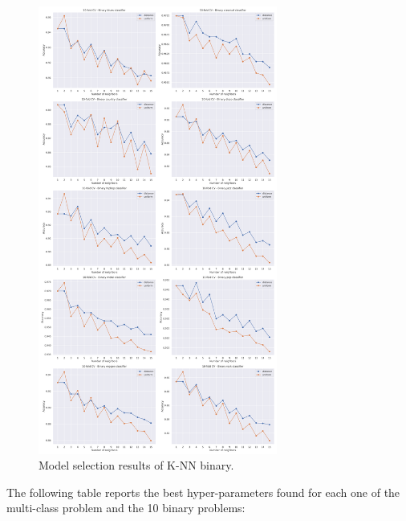 \documentclass{Configuration_Files/PoliMi3i_thesis}
\begin{document}
\begin{figure}[H]
    \centering
    \includegraphics[width=0.7\textwidth]{Figures/knn_selection_b.png}
    \caption{Model selection results of K-NN binary.}
    \label{fig:knn_sel_b}
\end{figure}

The following table reports the best hyper-parameters found for each one of the multi-class problem and the 10 binary problems:
\end{document}
